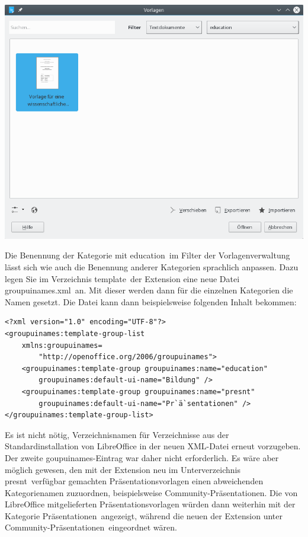 \documentclass[a4paper,10pt,pagesize,titlepage]{scrbook}
\begin{document}
\begin{center}
	\captionsetup{type=figure}
	\includegraphics[width=0.9\linewidth]{pics/template_administration_dialog_with_new_template_section}
	\label{fig:template_administration_dialog_with_new_template_section}
\end{center}



Die Benennung der Kategorie mit \glqq education\grqq~im Filter der Vorlagenverwaltung lässt sich wie auch die Benennung anderer Kategorien sprachlich anpassen. Dazu legen Sie im Verzeichnis \glqq template\grqq~der Extension eine neue Datei \glqq groupuinames.xml\grqq~an. Mit dieser werden dann für die einzelnen Kategorien die Namen gesetzt. Die Datei kann dann beispielsweise folgenden Inhalt bekommen:

\begin{lstlisting}[language={[LaTeX]TeX},inputencoding={utf8},extendedchars=false, escapeinside=``]
<?xml version="1.0" encoding="UTF-8"?>
<groupuinames:template-group-list
    xmlns:groupuinames=
        "http://openoffice.org/2006/groupuinames">
    <groupuinames:template-group groupuinames:name="education"
        groupuinames:default-ui-name="Bildung" />
    <groupuinames:template-group groupuinames:name="presnt"
        groupuinames:default-ui-name="Pr`ä`sentationen" />
</groupuinames:template-group-list>

\end{lstlisting}

Es ist nicht nötig, Verzeichnisnamen für Verzeichnisse aus der Standardinstallation von LibreOffice in der neuen XML-Datei erneut vorzugeben. Der zweite goupuinames-Eintrag war daher nicht erforderlich. Es wäre aber möglich gewesen, den mit der Extension neu im Unterverzeichnis \glqq presnt\grqq~verfügbar gemachten Präsentationsvorlagen einen abweichenden Kategorienamen zuzuordnen, beispielsweise \glqq Community-Präsentationen\grqq. Die von LibreOffice mitgelieferten Präsentationsvorlagen würden dann weiterhin mit der Kategorie \glqq Präsentationen\grqq~angezeigt, während die neuen der Extension unter \glqq Community-Präsentationen\grqq~eingeordnet wären.
\end{document}
